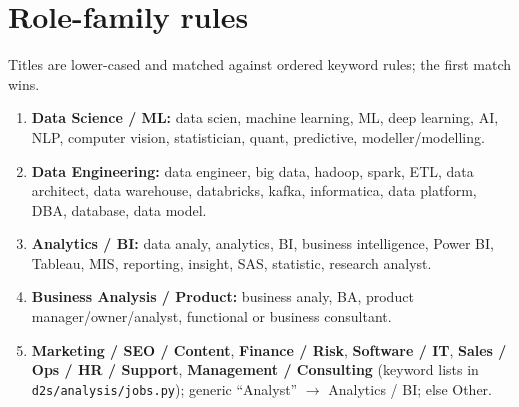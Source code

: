 \section{Role-family rules}\label{app:families}
Titles are lower-cased and matched against ordered keyword rules; the first match wins.
\begin{enumerate}
  \item \textbf{Data Science / ML:} data scien, machine learning, ML, deep learning, AI, NLP,
        computer vision, statistician, quant, predictive, modeller/modelling.
  \item \textbf{Data Engineering:} data engineer, big data, hadoop, spark, ETL, data architect,
        data warehouse, databricks, kafka, informatica, data platform, DBA, database, data model.
  \item \textbf{Analytics / BI:} data analy, analytics, BI, business intelligence, Power BI, Tableau,
        MIS, reporting, insight, SAS, statistic, research analyst.
  \item \textbf{Business Analysis / Product:} business analy, BA, product manager/owner/analyst,
        functional or business consultant.
  \item \textbf{Marketing / SEO / Content}, \textbf{Finance / Risk}, \textbf{Software / IT},
        \textbf{Sales / Ops / HR / Support}, \textbf{Management / Consulting} (keyword lists in
        \texttt{d2s/analysis/jobs.py}); generic ``Analyst'' $\rightarrow$ Analytics / BI; else Other.
\end{enumerate}

